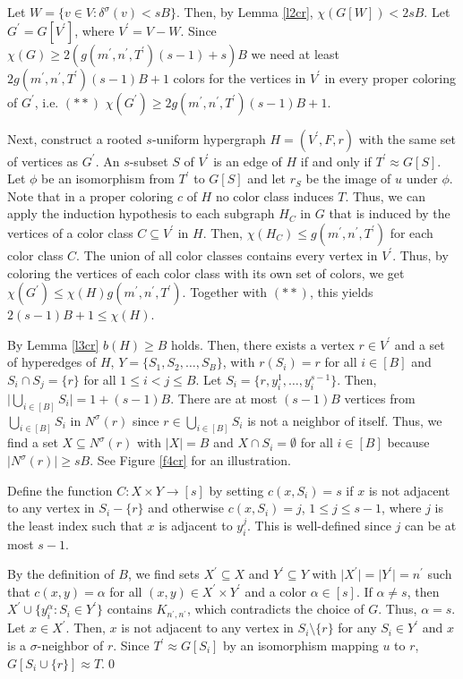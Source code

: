 \begin{prf}
Let $W=\{v\in V:\delta^\sigma (v) <sB\}$. Then, by Lemma \ref{l2cr}, $\chi (G[W]) < 2sB$. Let $G^\prime = G[V^\prime ]$, where $V^\prime = V-W$. Since $\chi (G)\geq 2(g(m^\prime ,n^\prime ,T^\prime )(s-1)+s)B$ we need at least $2g(m^\prime ,n^\prime ,T^\prime )(s-1)B + 1$ colors for the vertices in $V^\prime$ in every proper coloring of $G^\prime$, i.e. $(\ast\ast)$ $\chi (G^\prime )\geq 2g(m^\prime ,n^\prime ,T^\prime )(s-1)B + 1$.

Next, construct a rooted $s$-uniform hypergraph $H=(V^\prime ,F,r)$ with the same set of vertices as $G^\prime$. An $s$-subset $S$ of $V^\prime$ is an edge of $H$ if and only if $T^\prime\approx G[S]$. Let $\phi$ be an isomorphism from $T^\prime$ to $G[S]$ and let $r_S$ be the image of $u$ under $\phi$. Note that in a proper coloring $c$ of $H$ no color class induces $T$. Thus, we can apply the induction hypothesis to each subgraph $H_C$ in $G$ that is induced by the vertices of a color class $C\subseteq V^\prime$ in $H$. Then, $\chi (H_C)\leq g(m^\prime , n^\prime , T^\prime )$ for each color class $C$. The union of all color classes contains every vertex in $V^\prime$. Thus, by coloring the vertices of each color class with its own set of colors, we get $\chi (G^\prime )\leq \chi (H)g(m^\prime ,n^\prime ,T^\prime )$. Together with $(\ast\ast)$, this yields $2(s-1)B +1\leq \chi (H)$.

By Lemma \ref{l3cr} $b(H)\geq B$ holds. Then, there exists a vertex $r\in V^\prime$ and a set of hyperedges of $H$, $Y = \{S_1,S_2,\dots ,S_B\}$, with $r(S_i)=r$ for all $i\in [B]$ and $S_i\cap S_j=\{r\}$ for all $1\leq i<j\leq B$. Let $S_i=\{r,y_i^1,\dots ,y_i^{s-1}\}$. Then, $\vert \bigcup_{i\in [B]} S_i\vert =1 +(s-1)B$. There are at most $(s-1)B$ vertices from $\bigcup_{i\in [B]} S_i$ in $N^\sigma (r)$ since $r\in \bigcup_{i\in [B]} S_i$ is not a neighbor of itself. Thus, we find a set $X\subseteq N^\sigma (r)$ with $\vert X\vert =B$ and $X\cap S_i =\emptyset$ for all $i\in [B]$ because $\vert N^\sigma (r)\vert\geq sB$. See Figure \ref{f4cr} for an illustration. 

Define the function $C:X\times Y\to [s]$ by setting $c(x,S_i)=s$ if $x$ is not adjacent to any vertex in $S_i-\{r\}$ and otherwise $c(x,S_i)=j$, $1\leq j\leq s-1$, where $j$ is the least index such that $x$ is adjacent to $y_i^j$. This is well-defined since $j$ can be at most $s-1$.

By the definition of $B$, we find sets $X^\prime\subseteq X$ and $Y^\prime\subseteq Y$ with $\vert X^\prime\vert = \vert Y^\prime\vert =n^\prime$ such that $c(x,y)=\alpha$ for all $(x,y)\in X^\prime\times Y^\prime$ and a color $\alpha\in [s]$. If $\alpha\neq s$, then $X^\prime\cup\{y_i^\alpha :S_i\in Y^\prime\}$ contains $K_{n^\prime ,n^\prime}$, which contradicts the choice of $G$. Thus, $\alpha = s$. Let $x\in X^\prime$. Then, $x$ is not adjacent to any vertex in $S_i \setminus \{r\}$ for any $S_i\in Y^\prime$ and $x$ is a $\sigma$-neighbor of $r$. Since $T^\prime\approx G[S_i]$ by an isomorphism mapping $u$ to $r$, $G[S_i\cup\{r\}]\approx T$.\qed
\end{prf}

